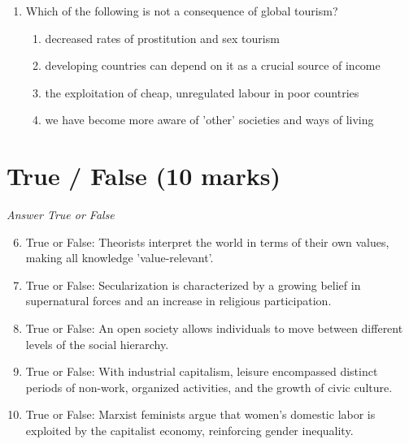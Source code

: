\documentclass[12pt]{article}
\begin{document}
\begin{enumerate}[label=\arabic*.]
\begin{enumerate}[label=(\alph*)]
    \item Functionalism
    \item Conflict theory
    \item Symbolic interactionism
    \item Role theory
\end{enumerate}
\item Which of the following is not a consequence of global tourism?
\begin{enumerate}[label=(\alph*)]
    \item decreased rates of prostitution and sex tourism
    \item developing countries can depend on it as a crucial source of income
    \item the exploitation of cheap, unregulated labour in poor countries
    \item we have become more aware of 'other' societies and ways of living
\end{enumerate}
\end{enumerate}

\section*{True / False (10 marks)}
\textit{Answer True or False}
\begin{enumerate}[label=\arabic*.]
\setcounter{enumi}{5}
\item True or False: Theorists interpret the world in terms of their own values, making all knowledge 'value-relevant'.
\item True or False: Secularization is characterized by a growing belief in supernatural forces and an increase in religious participation.
\item True or False: An open society allows individuals to move between different levels of the social hierarchy.
\item True or False: With industrial capitalism, leisure encompassed distinct periods of non-work, organized activities, and the growth of civic culture.
\item True or False: Marxist feminists argue that women's domestic labor is exploited by the capitalist economy, reinforcing gender inequality.
\end{enumerate}
\end{document}

